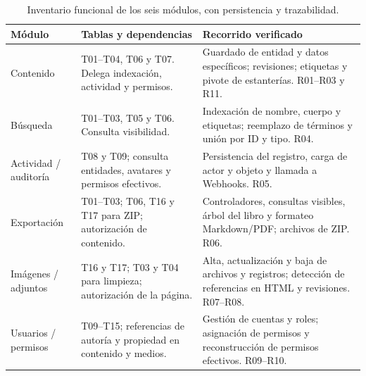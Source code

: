 \begingroup\small
\begin{xltabular}{\textwidth}{p{2.6cm}XX}
\caption{Inventario funcional de los seis módulos, con persistencia y trazabilidad.}\label{tab:f5-modulos}\\
\toprule
\textbf{Módulo} & \textbf{Tablas y dependencias} & \textbf{Recorrido verificado} \\
\midrule\endhead
Contenido & T01--T04, T06 y T07. Delega indexación, actividad y permisos. & Guardado de entidad y datos específicos; revisiones; etiquetas y pivote de estanterías. R01--R03 y R11. \\
Búsqueda & T01--T03, T05 y T06. Consulta visibilidad. & Indexación de nombre, cuerpo y etiquetas; reemplazo de términos y unión por ID y tipo. R04. \\
Actividad / auditoría & T08 y T09; consulta entidades, avatares y permisos efectivos. & Persistencia del registro, carga de actor y objeto y llamada a Webhooks. R05. \\
Exportación & T01--T03; T06, T16 y T17 para ZIP; autorización de contenido. & Controladores, consultas visibles, árbol del libro y formateo Markdown/PDF; archivos de ZIP. R06. \\
Imágenes / adjuntos & T16 y T17; T03 y T04 para limpieza; autorización de la página. & Alta, actualización y baja de archivos y registros; detección de referencias en HTML y revisiones. R07--R08. \\
Usuarios / permisos & T09--T15; referencias de autoría y propiedad en contenido y medios. & Gestión de cuentas y roles; asignación de permisos y reconstrucción de permisos efectivos. R09--R10. \\
\bottomrule
\end{xltabular}
\endgroup

